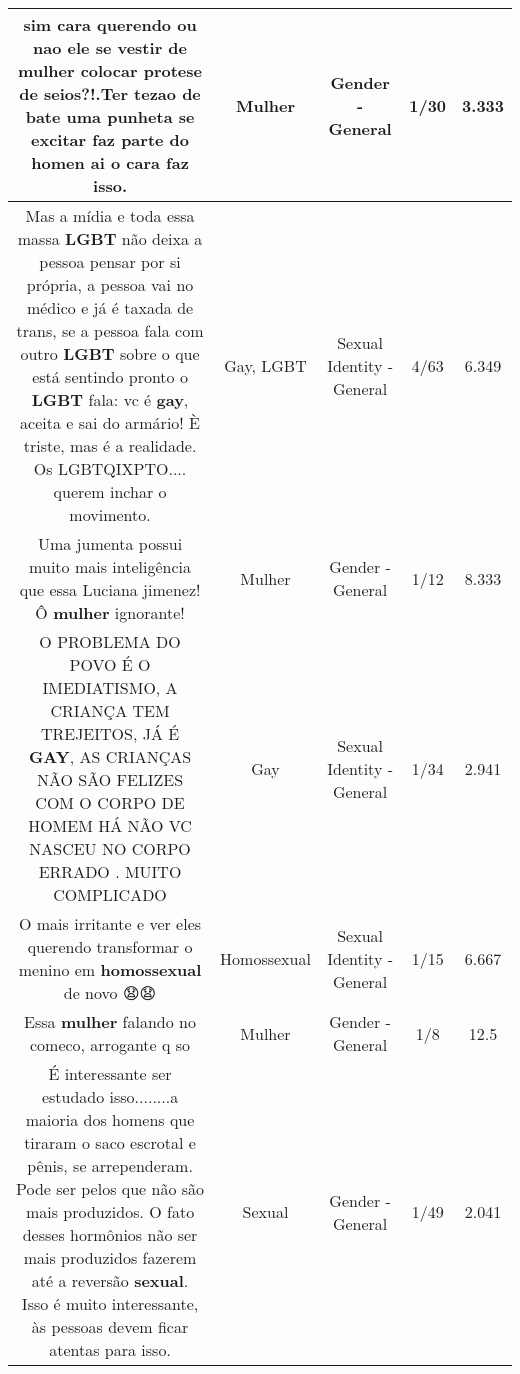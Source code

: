 \documentclass[11pt]{article}
\newlength\mylength
\begin{document}
\begin{center}
\begin{longtable}{|C{.65\mylength}|C{.30\mylength}|C{.12\mylength}|C{.12\mylength}|C{.12\mylength}|}
  \small sim cara querendo ou nao ele se vestir de \textbf{mulher} colocar protese de seios?!.Ter tezao de bate uma punheta  se excitar faz parte do homen ai o cara faz isso.\normalsize   & Mulher & Gender - General & 1/30 & 3.333 \\  \hline
  \small Mas a mídia e toda essa massa \textbf{LGBT} não deixa a pessoa pensar por si própria, a pessoa vai no médico e já é taxada de trans, se a pessoa fala com outro \textbf{LGBT} sobre o que está sentindo pronto o \textbf{LGBT} fala: vc é \textbf{gay}, aceita e sai do armário!    È triste, mas é a realidade. Os LGBTQIXPTO.... querem inchar o movimento.\normalsize   & Gay, LGBT & Sexual Identity - General & 4/63 & 6.349 \\  \hline
  \small Uma jumenta possui muito mais inteligência que essa Luciana jimenez!Ô \textbf{mulher} ignorante!\normalsize   & Mulher & Gender - General & 1/12 & 8.333 \\  \hline
  \small O PROBLEMA DO POVO É O IMEDIATISMO, A CRIANÇA TEM TREJEITOS, JÁ É \textbf{GAY}, AS CRIANÇAS NÃO SÃO FELIZES COM O CORPO DE HOMEM HÁ NÃO VC NASCEU NO CORPO ERRADO . MUITO COMPLICADO\normalsize   & Gay & Sexual Identity - General & 1/34 & 2.941 \\  \hline
  \small O mais irritante e ver eles querendo transformar o menino em \textbf{homossexual} de novo 😧😧\normalsize   & Homossexual & Sexual Identity - General & 1/15 & 6.667 \\  \hline
  \small Essa \textbf{mulher} falando no comeco, arrogante q so\normalsize   & Mulher & Gender - General & 1/8 & 12.5 \\  \hline
  \small É interessante ser estudado isso........a maioria dos homens que tiraram o saco escrotal e pênis, se arrependeram. Pode ser pelos que não são mais produzidos. O fato desses hormônios não ser mais produzidos fazerem até a reversão \textbf{sexual}. Isso é muito interessante, às pessoas devem ficar atentas para isso.\normalsize   & Sexual & Gender - General & 1/49 & 2.041 \\  \hline

\end{longtable}
\end{center}
\end{document}
